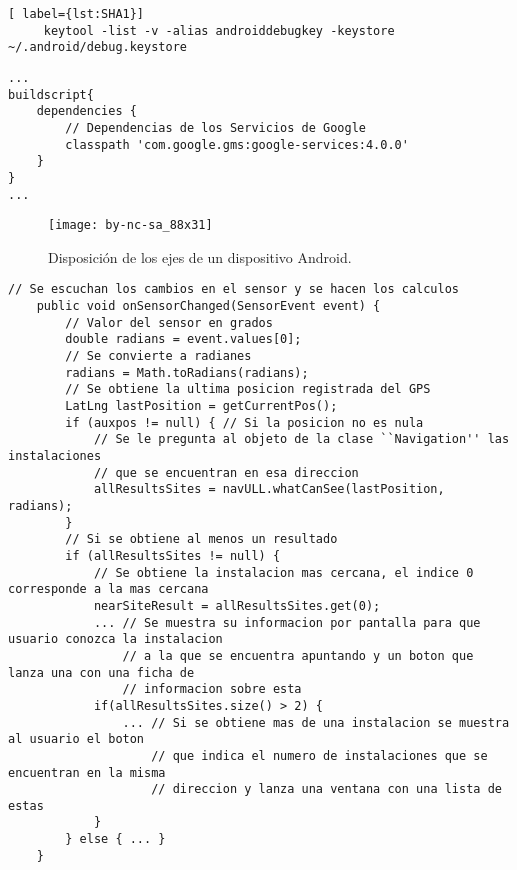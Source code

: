 \begin{lstlisting}[ label={lst:SHA1}]
     keytool -list -v -alias androiddebugkey -keystore ~/.android/debug.keystore
\end{lstlisting} 

\begin{lstlisting}[caption={Fichero \texttt{build.gradle} del proyecto, dependencias para utilizar los Servicios de Google.}, label={lst:googleSd}]
...
buildscript{
    dependencies {
        // Dependencias de los Servicios de Google
        classpath 'com.google.gms:google-services:4.0.0'
    }    
} 
...
\end{lstlisting}
 

 
\begin{figure}[h]
    \centering
    \texttt{[image: by-nc-sa\_88x31]}
    \caption{Disposición de los ejes de un dispositivo Android.}
    \label{fig:xyz}
\end{figure}    

\begin{minipage}{\linewidth}
\begin{lstlisting}[caption={Código que se ejecuta cada vez que se registra un cambio en el sensor que calcula la orientación.}, label={lst:orientacionL}]
    // Se escuchan los cambios en el sensor y se hacen los calculos
    public void onSensorChanged(SensorEvent event) {
        // Valor del sensor en grados
        double radians = event.values[0]; 
        // Se convierte a radianes
        radians = Math.toRadians(radians);
        // Se obtiene la ultima posicion registrada del GPS
        LatLng lastPosition = getCurrentPos();
        if (auxpos != null) { // Si la posicion no es nula
            // Se le pregunta al objeto de la clase ``Navigation'' las instalaciones 
            // que se encuentran en esa direccion
            allResultsSites = navULL.whatCanSee(lastPosition, radians);
        }
        // Si se obtiene al menos un resultado
        if (allResultsSites != null) {
            // Se obtiene la instalacion mas cercana, el indice 0 corresponde a la mas cercana
            nearSiteResult = allResultsSites.get(0);
            ... // Se muestra su informacion por pantalla para que usuario conozca la instalacion  
                // a la que se encuentra apuntando y un boton que lanza una con una ficha de 
                // informacion sobre esta
            if(allResultsSites.size() > 2) {
                ... // Si se obtiene mas de una instalacion se muestra al usuario el boton
                    // que indica el numero de instalaciones que se encuentran en la misma
                    // direccion y lanza una ventana con una lista de estas
            }
        } else { ... }
    } 
\end{lstlisting}
\end{minipage}

